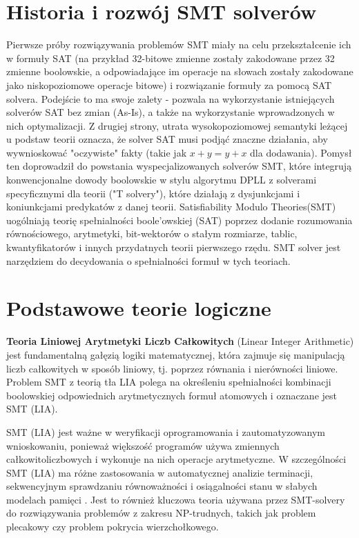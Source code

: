 \section{Historia i rozwój SMT solverów}
Pierwsze próby rozwiązywania problemów SMT miały na celu przekształcenie ich w formuły SAT (na przykład 32-bitowe zmienne zostały zakodowane przez 32 zmienne boolowskie, a odpowiadające im operacje na słowach zostały zakodowane jako niskopoziomowe operacje bitowe) i rozwiązanie formuły za pomocą SAT solvera. Podejście to ma swoje zalety - pozwala na wykorzystanie istniejących solverów SAT bez zmian (As-Is), a także na wykorzystanie wprowadzonych w nich optymalizacji. Z drugiej strony, utrata wysokopoziomowej semantyki leżącej u podstaw teorii oznacza, że solver SAT musi podjąć znaczne działania, aby wywnioskować "oczywiste" fakty (takie jak $x + y = y + x$ dla dodawania). Pomysł ten doprowadził do powstania wyspecjalizowanych solverów SMT, które integrują konwencjonalne dowody boolowskie w stylu algorytmu DPLL z solverami specyficznymi dla teorii ("T solvery"), które działają z dysjunkcjami i koniunkcjami predykatów z danej teorii. 
Satisfiability Modulo Theories(SMT) uogólniają teorię spełnialności boole'owskiej (SAT) poprzez dodanie rozumowania równościowego, arytmetyki, bit-wektorów o stałym rozmiarze, tablic, kwantyfikatorów i innych przydatnych teorii pierwszego rzędu.
SMT solver jest narzędziem do decydowania o spełnialności formuł w tych teoriach. 

\section{Podstawowe teorie logiczne}

\textbf{Teoria Liniowej Arytmetyki Liczb Całkowitych} (Linear Integer Arithmetic) jest fundamentalną gałęzią logiki matematycznej, która zajmuje się manipulacją liczb całkowitych w sposób liniowy, tj. poprzez równania i nierówności liniowe. Problem SMT z teorią tła LIA polega na określeniu spełnialności kombinacji boolowskiej odpowiednich arytmetycznych formuł atomowych i oznaczane jest SMT (LIA). 

SMT (LIA) jest ważne w weryfikacji oprogramowania i zautomatyzowanym wnioskowaniu, ponieważ większość programów używa zmiennych całkowitoliczbowych i wykonuje na nich operacje arytmetyczne. W szczególności SMT (LIA) ma różne zastosowania w automatycznej analizie terminacji, sekwencyjnym sprawdzaniu równoważności i osiągalności stanu w słabych modelach pamięci \cite{CaiLZ22}. Jest to również kluczowa teoria używana przez SMT-solvery do rozwiązywania problemów z zakresu NP-trudnych, takich jak problem plecakowy czy problem pokrycia wierzchołkowego.


